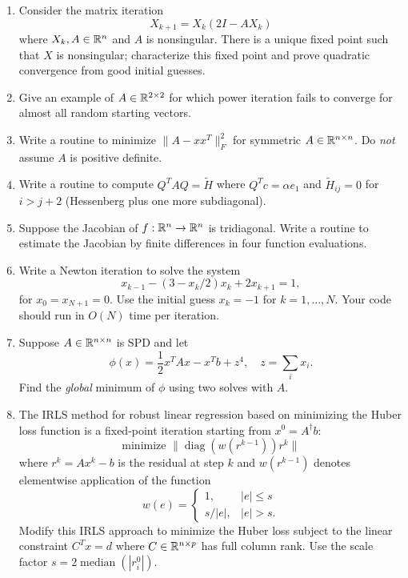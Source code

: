 \documentclass[12pt, leqno]{article}
\begin{document}
\begin{enumerate}
\item
  Consider the matrix iteration
  \[
    X_{k+1} = X_k (2I-A X_k)
  \]
  where $X_k, A \in \mathbb{R}^n$ and $A$ is nonsingular.  There is a unique
  fixed point such that $X$ is nonsingular; characterize this
  fixed point and prove quadratic convergence from good initial
  guesses.

\item
  Give an example of $A \in \mathbb{R}^{2 \times 2}$ for which power iteration fails
  to converge for almost all random starting vectors.

\item
  Write a routine to minimize $\|A-xx^T\|_F^2$ for symmetric
  $A \in \mathbb{R}^{n \times n}$.
  Do {\em not} assume $A$ is positive definite.

\item
  Write a routine to compute $Q^T A Q = \tilde{H}$ where
  $Q^T c = \alpha e_1$ and $\tilde{H}_{ij} = 0$ for $i > j+2$
  (Hessenberg plus one more subdiagonal).

\item
  Suppose the Jacobian of $f : \mathbb{R}^n \rightarrow \mathbb{R}^n$ is
  tridiagonal.  Write a routine to estimate the Jacobian by
  finite differences in four function evaluations.

\item
  Write a Newton iteration to solve the system
  \[
    x_{k-1} - (3-x_k/2) x_k + 2 x_{k+1} = 1,
  \]
  for $x_0 = x_{N+1} = 0$.  Use the initial guess $x_k = -1$ for $k=1,
  \ldots, N$.  Your code should run in $O(N)$ time per iteration.

\item
  Suppose $A \in \mathbb{R}^{n \times n}$ is SPD and let
  \[
    \phi(x) = \frac{1}{2} x^T A x - x^T b + z^4, \quad
    z = \sum_i x_i.
  \]
  Find the {\em global} minimum of $\phi$ using two solves with $A$.

\item
  The IRLS method for robust linear regression based on minimizing the
  Huber loss function is a fixed-point iteration starting from
  $x^0 = A^\dagger b$:
  \[
    \mbox{minimize } \|\operatorname{diag}(w(r^{k-1})) r^k\|
  \]
  where $r^k = Ax^k-b$ is the residual at step $k$ and $w(r^{k-1})$
  denotes elementwise application of the function
  \[
    w(e) = \begin{cases} 1, & |e| \leq s \\ s/|e|, & |e| > s. \end{cases}
  \]
  Modify this IRLS approach to minimize the Huber loss subject to the
  linear constraint $C^T x = d$ where $C \in \mathbb{R}^{n \times p}$ has
  full column rank.  Use the scale factor
  $s = 2 \operatorname{median}(|r_i^0|)$.
    
\end{enumerate}
\end{document}
